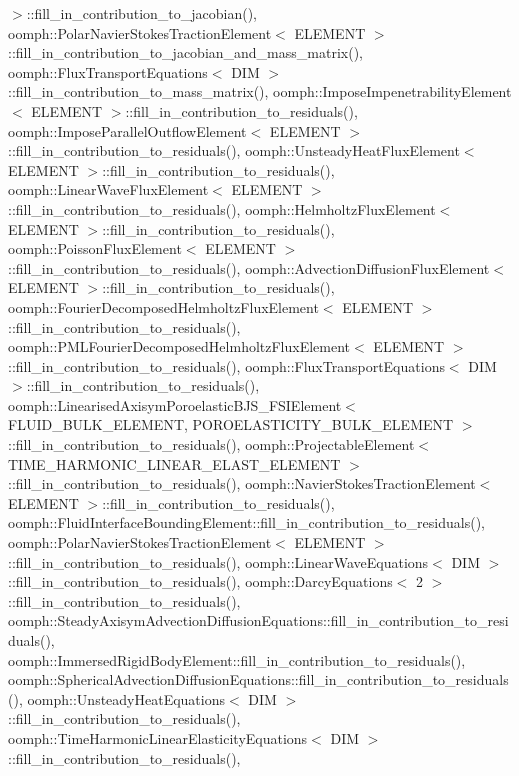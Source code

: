 $>$\+::fill\+\_\+in\+\_\+contribution\+\_\+to\+\_\+jacobian(), oomph\+::\+Polar\+Navier\+Stokes\+Traction\+Element$<$ E\+L\+E\+M\+E\+N\+T $>$\+::fill\+\_\+in\+\_\+contribution\+\_\+to\+\_\+jacobian\+\_\+and\+\_\+mass\+\_\+matrix(), oomph\+::\+Flux\+Transport\+Equations$<$ D\+I\+M $>$\+::fill\+\_\+in\+\_\+contribution\+\_\+to\+\_\+mass\+\_\+matrix(), oomph\+::\+Impose\+Impenetrability\+Element$<$ E\+L\+E\+M\+E\+N\+T $>$\+::fill\+\_\+in\+\_\+contribution\+\_\+to\+\_\+residuals(), oomph\+::\+Impose\+Parallel\+Outflow\+Element$<$ E\+L\+E\+M\+E\+N\+T $>$\+::fill\+\_\+in\+\_\+contribution\+\_\+to\+\_\+residuals(), oomph\+::\+Unsteady\+Heat\+Flux\+Element$<$ E\+L\+E\+M\+E\+N\+T $>$\+::fill\+\_\+in\+\_\+contribution\+\_\+to\+\_\+residuals(), oomph\+::\+Linear\+Wave\+Flux\+Element$<$ E\+L\+E\+M\+E\+N\+T $>$\+::fill\+\_\+in\+\_\+contribution\+\_\+to\+\_\+residuals(), oomph\+::\+Helmholtz\+Flux\+Element$<$ E\+L\+E\+M\+E\+N\+T $>$\+::fill\+\_\+in\+\_\+contribution\+\_\+to\+\_\+residuals(), oomph\+::\+Poisson\+Flux\+Element$<$ E\+L\+E\+M\+E\+N\+T $>$\+::fill\+\_\+in\+\_\+contribution\+\_\+to\+\_\+residuals(), oomph\+::\+Advection\+Diffusion\+Flux\+Element$<$ E\+L\+E\+M\+E\+N\+T $>$\+::fill\+\_\+in\+\_\+contribution\+\_\+to\+\_\+residuals(), oomph\+::\+Fourier\+Decomposed\+Helmholtz\+Flux\+Element$<$ E\+L\+E\+M\+E\+N\+T $>$\+::fill\+\_\+in\+\_\+contribution\+\_\+to\+\_\+residuals(), oomph\+::\+P\+M\+L\+Fourier\+Decomposed\+Helmholtz\+Flux\+Element$<$ E\+L\+E\+M\+E\+N\+T $>$\+::fill\+\_\+in\+\_\+contribution\+\_\+to\+\_\+residuals(), oomph\+::\+Flux\+Transport\+Equations$<$ D\+I\+M $>$\+::fill\+\_\+in\+\_\+contribution\+\_\+to\+\_\+residuals(), oomph\+::\+Linearised\+Axisym\+Poroelastic\+B\+J\+S\+\_\+\+F\+S\+I\+Element$<$ F\+L\+U\+I\+D\+\_\+\+B\+U\+L\+K\+\_\+\+E\+L\+E\+M\+E\+N\+T, P\+O\+R\+O\+E\+L\+A\+S\+T\+I\+C\+I\+T\+Y\+\_\+\+B\+U\+L\+K\+\_\+\+E\+L\+E\+M\+E\+N\+T $>$\+::fill\+\_\+in\+\_\+contribution\+\_\+to\+\_\+residuals(), oomph\+::\+Projectable\+Element$<$ T\+I\+M\+E\+\_\+\+H\+A\+R\+M\+O\+N\+I\+C\+\_\+\+L\+I\+N\+E\+A\+R\+\_\+\+E\+L\+A\+S\+T\+\_\+\+E\+L\+E\+M\+E\+N\+T $>$\+::fill\+\_\+in\+\_\+contribution\+\_\+to\+\_\+residuals(), oomph\+::\+Navier\+Stokes\+Traction\+Element$<$ E\+L\+E\+M\+E\+N\+T $>$\+::fill\+\_\+in\+\_\+contribution\+\_\+to\+\_\+residuals(), oomph\+::\+Fluid\+Interface\+Bounding\+Element\+::fill\+\_\+in\+\_\+contribution\+\_\+to\+\_\+residuals(), oomph\+::\+Polar\+Navier\+Stokes\+Traction\+Element$<$ E\+L\+E\+M\+E\+N\+T $>$\+::fill\+\_\+in\+\_\+contribution\+\_\+to\+\_\+residuals(), oomph\+::\+Linear\+Wave\+Equations$<$ D\+I\+M $>$\+::fill\+\_\+in\+\_\+contribution\+\_\+to\+\_\+residuals(), oomph\+::\+Darcy\+Equations$<$ 2 $>$\+::fill\+\_\+in\+\_\+contribution\+\_\+to\+\_\+residuals(), oomph\+::\+Steady\+Axisym\+Advection\+Diffusion\+Equations\+::fill\+\_\+in\+\_\+contribution\+\_\+to\+\_\+residuals(), oomph\+::\+Immersed\+Rigid\+Body\+Element\+::fill\+\_\+in\+\_\+contribution\+\_\+to\+\_\+residuals(), oomph\+::\+Spherical\+Advection\+Diffusion\+Equations\+::fill\+\_\+in\+\_\+contribution\+\_\+to\+\_\+residuals(), oomph\+::\+Unsteady\+Heat\+Equations$<$ D\+I\+M $>$\+::fill\+\_\+in\+\_\+contribution\+\_\+to\+\_\+residuals(), oomph\+::\+Time\+Harmonic\+Linear\+Elasticity\+Equations$<$ D\+I\+M $>$\+::fill\+\_\+in\+\_\+contribution\+\_\+to\+\_\+residuals(), 